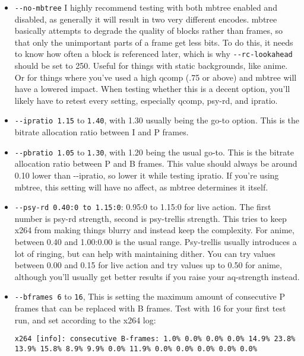 \documentclass{scrartcl}
\begin{document}
\begin{itemize}
\item \texttt{-{}-no-mbtree} I highly recommend testing with both mbtree enabled and disabled, as generally it will result in two very different encodes. mbtree basically attempts to degrade the quality of blocks rather than frames, so that only the unimportant parts of a frame get less bits. To do this, it needs to know how often a block is referenced later, which is why \texttt{-{}-rc-lookahead} should be set to 250. Useful for things with static backgrounds, like anime. Or for things where you've used a high qcomp (.75 or above) and mbtree will have a lowered impact.  When testing whether this is a decent option, you'll likely have to retest every setting, especially qcomp, psy-rd, and ipratio.
\item \texttt{-{}-ipratio 1.15} to \texttt{1.40}, with 1.30 usually being the go-to option.  This is the bitrate allocation ratio between I and P frames.
\item \texttt{-{}-pbratio 1.05} to \texttt{1.30}, with 1.20 being the usual go-to.  This is the bitrate allocation ratio between P and B frames.  This value should always be around 0.10 lower than -{}-ipratio, so lower it while testing ipratio.  If you're using mbtree, this setting will have no affect, as mbtree determines it itself.
\item \texttt{-{}-psy-rd 0.40:0 to 1.15:0}: 0.95:0 to 1.15:0 for live action. The first number is psy-rd strength, second is psy-trellis strength. This tries to keep x264 from making things blurry and instead keep the complexity. For anime, between 0.40 and 1.00:0.00 is the usual range.  Psy-trellis usually introduces a lot of ringing, but can help with maintaining dither.  You can try values between 0.00 and 0.15 for live action and try values up to 0.50 for anime, although you'll usually get better results if you raise your aq-strength instead.
\item \texttt{-{}-bframes 6} to \texttt{16}, This is setting the maximum amount of consecutive P frames that can be replaced with B frames. Test with 16 for your first test run, and set according to the x264 log:

\texttt{x264 [info]: consecutive B-frames:  1.0\%  0.0\%  0.0\%  0.0\% 14.9\% 23.8\% 13.9\% 15.8\%  8.9\%  9.9\%  0.0\% 11.9\%  0.0\%  0.0\%  0.0\%  0.0\%  0.0\%}


\end{itemize}
\end{document}
